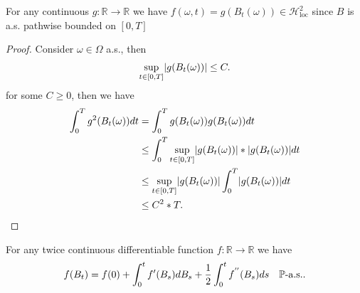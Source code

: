 \spewnotes
\begin{remark}[3.12]
  For any continuous $g: \mathbb{R}\to \mathbb{R}$  we have $f(\omega ,t) = g(B_t(\omega )) \in  \mathcal{H}^{2}_{\text{loc}} $  since $B$ is a.s. pathwise
  bounded on $[0,T]$
\end{remark}
\begin{proof}
 Consider $\omega \in  \Omega $ a.s., then 
 \begin{align*}
   \sup_{t \in  [0,T]}\abs{g(B_t(\omega ))} \le C 
 .\end{align*}
 for some $C\ge 0$, then we have 
\begin{align*}
  \int_0^{T}  g^2(B_t(\omega )) dt &=  \int_0^{T}  g(B_t(\omega ))g(B_t(\omega)) dt\\
                                   &\le \int_0^{T}  \sup_{t \in  [0,T]} \abs{g(B_t(\omega ))}* \abs{g(B_t(\omega))} dt\\
                                   &\le  \sup_{t \in  [0,T]} \abs{g(B_t(\omega ))}\int_0^{T} \abs{g(B_t(\omega))} dt\\
                                   &\le C^2*T 
.\end{align*}
\end{proof}
\begin{Theorem}[3.18]
 For any twice continuous differentiable function $f : \mathbb{R} \to \mathbb{R}$  we have 
 \begin{align*}
   f(B_t) = f(0) + \int_0^{t}  f'(B_s)dB_s + \frac{1}{2} \int_0^{t} f^{''}(B_s) ds  \quad \P \text{-a.s.}
 .\end{align*}
\end{Theorem}
